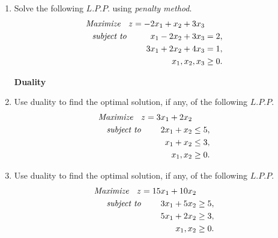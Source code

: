 \documentclass[11pt, a4paper]{article}
\begin{document}
\begin{enumerate}
\vspace{20pt}


\item Solve the following $L.P.P.$ using \textit{penalty method}.
	\begin{align*}
\textit{Maximize \hspace{6pt}} z = -2x_1 + x_2 + 3x_3 \\
\textit{subject to \hspace{25pt}} x_1 - 2x_2 + 3x_3 &= 2, \\
3x_1 + 2x_2 + 4x_3 &= 1, \\
x_1, x_2, x_3 &\geq 0.
	\end{align*}
	





















\newpage

\begin{center}
\textbf{\huge Duality}
\end{center}

\vspace{50pt}

\item Use duality to find the optimal solution, if any, of the following $L.P.P.$
	\begin{align*}
\textit{Maximize \hspace{6pt}} z = 3x_1 + 2x_2 \\
\textit{subject to \hspace{20pt}} 2x_1 + x_2 &\leq 5, \\
x_1 + x_2 &\leq 3, \\
x_1, x_2 &\geq 0.
	\end{align*}
	
	

\vspace{30pt}


\item Use duality to find the optimal solution, if any, of the following $L.P.P.$
	\begin{align*}
\textit{Maximize \hspace{6pt}} z = 15x_1 + 10x_2 \\
\textit{subject to \hspace{20pt}} 3x_1 + 5x_2 &\geq 5, \\
5x_1 + 2x_2 &\geq 3, \\
x_1, x_2 &\geq 0.
	\end{align*}
	











\end{enumerate}
\end{document}
